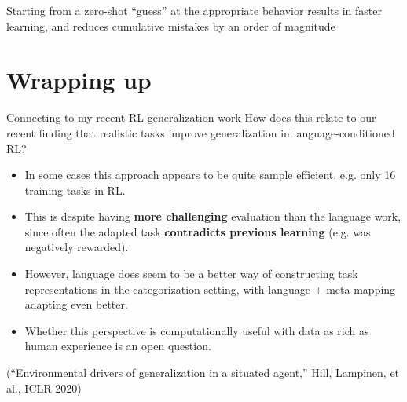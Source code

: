 \documentclass{beamer}
\begin{document}
\begin{frame}[standout]
Starting from a zero-shot ``guess'' at the appropriate behavior results in faster learning, and reduces cumulative mistakes by an order of magnitude 
\end{frame}


\section{Wrapping up}

\begin{frame}{Connecting to my recent RL generalization work}
How does this relate to our recent finding that realistic tasks improve generalization in language-conditioned RL?\par
\begin{itemize}[<+(2)->]
\item In some cases this approach appears to be quite sample efficient, e.g. only 16 training tasks in RL.
\item This is despite having \textbf{more challenging} evaluation than the language work, since often the adapted task \textbf{contradicts previous learning} (e.g. was negatively rewarded). 
\item However, language does seem to be a better way of constructing task representations in the categorization setting, with language + meta-mapping adapting even better.
\item Whether this perspective is computationally useful with data as rich as human experience is an open question.
\end{itemize}
(``Environmental drivers of generalization in a situated agent,'' Hill, Lampinen, et al., ICLR 2020)
\end{frame}
\end{document}
